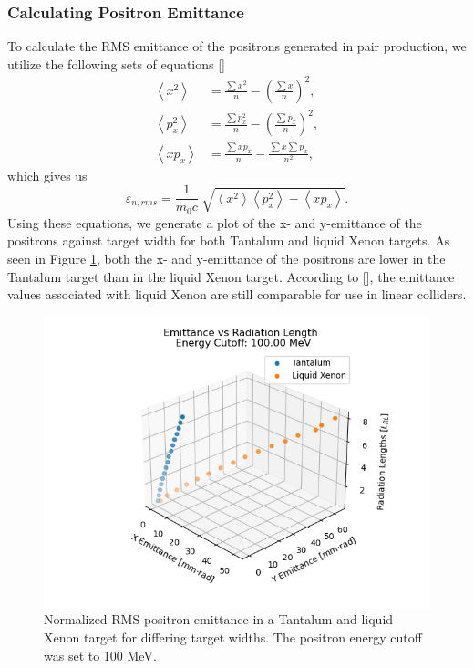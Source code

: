 \documentclass[%
reprint,
amsmath, amssymb,
aps,
floatfix,
]{revtex4-2}
\begin{document}
\subsubsection{Calculating Positron Emittance}
To calculate the RMS emittance of the positrons generated in pair production, we utilize the following sets
of equations []
\begin{subequations}
    \begin{eqnarray}
        \left\langle x^2 \right\rangle &= \frac{\sum x^2}{n} - \left( \frac{\sum x}{n} \right)^2, \label{subeq:x2} \\
        \left\langle p_x^2 \right\rangle &= \frac{\sum p_x^2}{n} - \left( \frac{\sum p_x}{n} \right)^2, \label{subeq:p2} \\ 
        \left\langle xp_x \right\rangle &= \frac{\sum xp_x}{n} - \frac{\sum x \sum p_x}{n^2}, \label{subeq:xp}
    \end{eqnarray}
\end{subequations}
which gives us
\begin{equation}
    \varepsilon_{n,rms} = \frac{1}{m_0c}\sqrt[]{\left\langle x^2 \right\rangle \left\langle p_x^2 \right\rangle - \left\langle xp_x \right\rangle}. \label{eq:Emittance}
\end{equation}
Using these equations, we generate a plot of the x- and y-emittance of the positrons against target width for both
Tantalum and liquid Xenon targets.  As seen in Figure \ref{fig:Emittance}, both the x- and y-emittance of the positrons
are lower in the Tantalum target than in the liquid Xenon target.  According to [], the emittance values associated
with liquid Xenon are still comparable for use in linear colliders.
\begin{figure}[h]
    \includegraphics[width = .825\linewidth]{../images/CompEmittance.png}
    \caption{\label{fig:Emittance}Normalized RMS positron emittance in a Tantalum and liquid Xenon target for differing target widths.
    The positron energy cutoff was set to 100 MeV.}
\end{figure}
\end{document}
